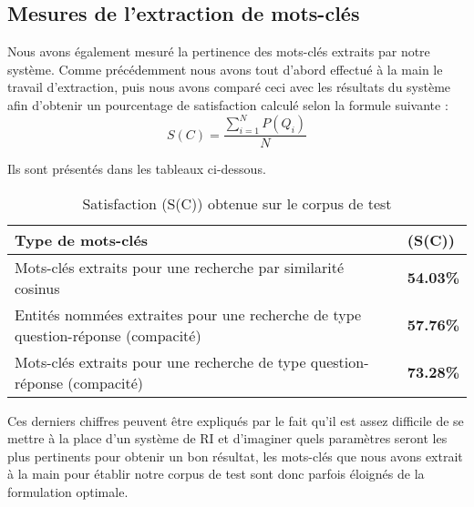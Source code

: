 \documentclass[10pt,a4paper]{article}
\begin{document}
\subsection{Mesures de l'extraction de mots-clés}

\par Nous avons également mesuré la pertinence des mots-clés extraits par notre système. Comme précédemment nous avons tout d'abord effectué \og{}à la main\fg{} le travail d'extraction, puis nous avons comparé ceci avec les résultats du système afin d'obtenir un pourcentage de satisfaction calculé selon la formule suivante : $$S(C) = \frac{\sum_{i = 1}^{N} P(Q_i)}{N}$$
\par Ils sont présentés dans les tableaux ci-dessous.

\begin{table}[htbp]
    \begin{center}
        \begin{tabular}{|p{12cm}|l|}
            \hline
            Type de mots-clés & (S(C)) \\
            \hline
            Mots-clés extraits pour une recherche par similarité cosinus & \textbf{54.03\%} \\
            \hline
            Entités nommées extraites pour une recherche de type question-réponse (compacité) & \textbf{57.76\%} \\
            \hline
            Mots-clés extraits pour une recherche de type question-réponse (compacité) & \textbf{73.28\%} \\
            \hline
        \end{tabular}
        \caption{\label{tab:results}Satisfaction (S(C)) obtenue sur le corpus de test}
    \end{center}
\end{table}

\par Ces derniers chiffres peuvent être expliqués par le fait qu'il est assez difficile de se mettre à la place d'un système de RI et d'imaginer quels paramètres seront les plus pertinents pour obtenir un bon résultat, les mots-clés que nous avons extrait \og{}à la main\fg{} pour établir notre corpus de test sont donc parfois éloignés de la formulation optimale.
\end{document}
